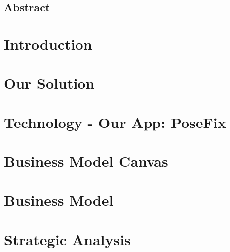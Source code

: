 \documentclass[a4paper, 11pt]{report}
\begin{document}
    

	{
		\FloatBarrier
		\newpage
        \setcounter{page}{2}
		\thispagestyle{plain}
		\vspace*{\fill}
			\section*{{\Large Abstract}}
			
		\vspace*{\fill}
	}

    {
        \FloatBarrier
        \newpage
        \tableofcontents
    }

	{
		\FloatBarrier
		\chapter{Introduction}
		\label{chp:introduction}
		
	}

	{
		\FloatBarrier
		\chapter{Our Solution}
		\label{chp:solution}
		
	}

	{
		\FloatBarrier
		\chapter{Technology - Our App: PoseFix}
		\label{chp:technology}
		
	}

	{
		\FloatBarrier
		\chapter{Business Model Canvas}
		\label{chp:business_model_canvas}
		
	}

	{
		\FloatBarrier
		\chapter{Business Model}
		\label{chp:business_model}
		
	}

	{
		\FloatBarrier
		\chapter{Strategic Analysis}
		\label{chp:strategic_analysis}
		
	}
\end{document}
